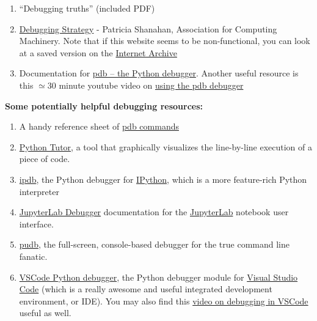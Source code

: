 \documentclass[10pt]{article}
\begin{document}
\begin{enumerate}

\item ``Debugging truths'' (included PDF)

\item \href{http://www.patriciashanahan.com/debug/}{Debugging
    Strategy} - Patricia Shanahan, Association for Computing Machinery.
  Note that if this website seems to be non-functional, you can look
  at a saved version on the
  \href{https://web.archive.org/web/20210502035235/http://www.patriciashanahan.com/debug/}{Internet Archive}

\item Documentation for \href{https://docs.python.org/3/library/pdb.html}{pdb -- the
    Python debugger}.  Another useful resource is this $\simeq 30$
  minute youtube video on 
  \href{https://www.youtube.com/watch?v=6KQ_h0XBmxk}{using the pdb debugger}

\end{enumerate}

\vspace{3mm}

\noindent
\textbf{Some potentially helpful debugging resources:}

\begin{enumerate}

\item A handy reference sheet of
  \href{http://web.stanford.edu/class/physics91si/2013/handouts/Pdb_Commands.pdf}{pdb
  commands}

\item \href{http://www.pythontutor.com/}{Python Tutor}, a tool that
  graphically visualizes the line-by-line execution of a piece of
  code.

\item 
  \href{https://pypi.org/project/ipdb/}{ipdb}, the Python debugger for
  \href{https://ipython.org/}{IPython}, which is a more feature-rich
  Python interpreter 

  \item
  \href{https://jupyterlab.readthedocs.io/en/stable/user/debugger.html}{JupyterLab
  Debugger} documentation for the
\href{https://jupyterlab.readthedocs.io/en/stable/}{JupyterLab}
notebook user interface.

\item \href{https://pypi.org/project/pudb/}{pudb}, the full-screen,
  console-based debugger for the true command line fanatic.

\item
  \href{https://code.visualstudio.com/docs/python/debugging}{VSCode
    Python debugger}, the Python debugger module for
  \href{https://code.visualstudio.com/}{Visual Studio Code} (which is
  a really awesome and useful integrated development environment, or
  IDE).  You may also find this
  \href{https://www.youtube.com/watch?v=b4p-SBjHh28}{video on
    debugging in VSCode} useful as well.


\end{enumerate}
\end{document}
